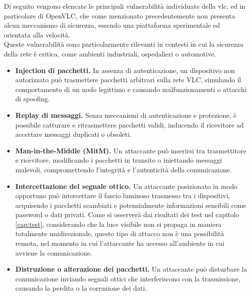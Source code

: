 
Di seguito vengono elencate le principali vulnerabilità individuate della \gls{vlc}, ed in particolare di OpenVLC, che come menzionato precedentemente non presenta alcun meccanismo di sicurezza, essendo una piattaforma sperimentale ed orientata alla velocità.\\
Queste vulnerabilità sono particolarmente rilevanti in contesti in cui la sicurezza della rete è critica, come ambienti industriali, ospedalieri o automotive.

\begin{itemize}
    \item \textbf{Injection di pacchetti.} In assenza di autenticazione, un dispositivo non autorizzato può trasmettere pacchetti arbitrari sulla rete VLC, simulando il comportamento di un nodo legittimo e causando malfunzionamenti o attacchi di spoofing.
    \item \textbf{Replay di messaggi.} Senza meccanismi di autenticazione e protezione, è possibile catturare e ritrasmettere pacchetti validi, inducendo il ricevitore ad accettare messaggi duplicati o obsoleti.
    \item \textbf{Man-in-the-Middle (MitM).} Un attaccante può inserirsi tra trasmettitore e ricevitore, modificando i pacchetti in transito o iniettando messaggi malevoli, compromettendo l'integrità e l'autenticità della comunicazione.
    \item \textbf{Intercettazione del segnale ottico.} Un attaccante posizionato in modo opportuno può intercettare il fascio luminoso trasmesso tra i dispositivi, acquisendo i pacchetti scambiati e potenzialmente informazioni sensibili come password o dati privati. Come si osserverà dai risultati dei test nel capitolo \ref{cap:test}, considerando che la luce visibile non si propaga in maniera totalmente unidirezionale, questo tipo di attacco non è una possibilità remota, nel momento in cui l'attaccante ha accesso all'ambiente in cui avviene la comunicazione.
    \item \textbf{Distruzione o alterazione dei pacchetti.} Un attaccante può disturbare la comunicazione inviando segnali ottici che interferiscono con la trasmissione, causando la perdita o la corruzione dei dati.
\end{itemize}

